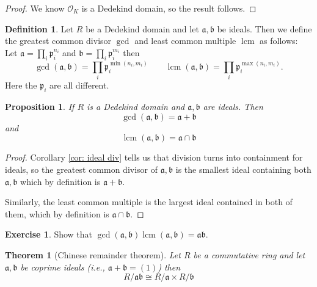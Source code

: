 \documentclass[11pt,a4paper]{report}
\theoremstyle{plain}
\newtheorem{theorem}[subsection]{Theorem}
\newtheorem{prop}[subsection]{Proposition}
\theoremstyle{definition}
\newtheorem{definition}[subsection]{Definition}
\theoremstyle{definition}
\newtheorem{question}[subsection]{Exercise}
\def\gothb{\mathfrak{b}}
\def\gothp{\mathfrak{p}}
\def \OO {\mathcal{O}}
\def\gotha{\mathfrak{a}}
\DeclareMathOperator{\lcm}{lcm}
\begin{document}
	\begin{proof}
		We know $\OO_K$ is a Dedekind domain, so the result follows.
	\end{proof}
	
	\begin{definition}\label{definition: ideal gcd and lcm}
		Let $R$ be a Dedekind domain and let $\gotha,\gothb$ be ideals. Then we define the greatest common divisor $\gcd$ and least common multiple $\lcm$ as follows: Let $\gotha=\prod_i \gothp_i^{n_i}$ and  $\gothb=\prod_i \gothp_i^{m_i}$ then
		\[\gcd(\gotha,\gothb)=\prod_i \gothp_i^{\min(n_i,m_i)} \qquad \lcm(\gotha,\gothb)=\prod_i \gothp_i^{\max(n_i,m_i)}.\]	Here the $\gothp_i$ are all different.
		
	\end{definition}
	
	\begin{prop}\label{prop: ideal gcd and lcm}
		If $R$ is a Dedekind domain and $\gotha,\gothb$ are ideals. Then	\[\gcd(\gotha,\gothb)=\gotha+\gothb\] and \[\lcm(\gotha,\gothb)=\gotha \cap \gothb\]
	\end{prop}
	
	\begin{proof}
		Corollary \ref{cor: ideal div} tells us that division turns into containment for ideals, so the greatest common divisor of $\gotha,\gothb$ is the smallest ideal containing both $\gotha,\gothb$ which by definition is $\gotha+\gothb$. 
		
		Similarly, the least common multiple is the largest ideal contained in both of them, which by definition is $\gotha \cap \gothb$.
	\end{proof}
	
	\begin{question}\label{ques: ideal gcd lcm}
		Show that $\gcd(\gotha,\gothb)\lcm(\gotha,\gothb)=\gotha\gothb$.
	\end{question}
	
	
	\begin{theorem}[Chinese remainder theorem]\label{thm: chinese rem theorem} Let $R$ be a commutative ring and let $\gotha,\gothb$ be coprime ideals (i.e., $\gotha+\gothb=(1)$) then \[R/\gotha\gothb \cong R/\gotha \times R/\gothb\]
	\end{theorem}
	
\end{document}
